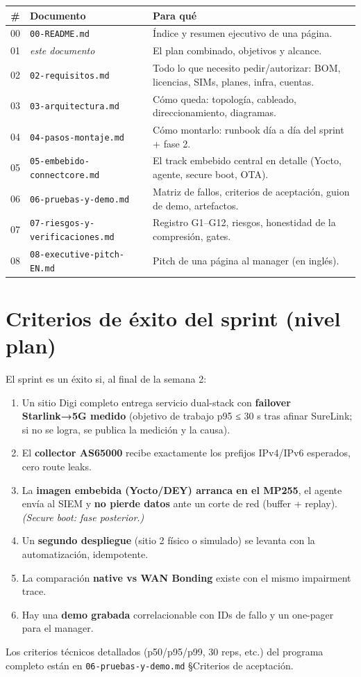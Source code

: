 \documentclass[11pt,a4paper]{article}
\newcommand{\hcell}[1]{\textbf{#1}}
\begin{document}
\begin{center}
\footnotesize
\begin{tabularx}{\textwidth}{@{}c p{5.9cm} X@{}}
\toprule
\hcell{\#} & \hcell{Documento} & \hcell{Para qué} \\
\midrule
00 & \texttt{00-README.md} & Índice y resumen ejecutivo de una página. \\
01 & \emph{este documento} & El plan combinado, objetivos y alcance. \\
02 & \texttt{02-requisitos.md} & Todo lo que necesito pedir/autorizar: BOM, licencias, SIMs, planes, infra, cuentas. \\
03 & \texttt{03-arquitectura.md} & Cómo queda: topología, cableado, direccionamiento, diagramas. \\
04 & \texttt{04-pasos-montaje.md} & Cómo montarlo: runbook día a día del sprint + fase 2. \\
05 & \texttt{05-embebido-connectcore.md} & El track embebido central en detalle (Yocto, agente, secure boot, OTA). \\
06 & \texttt{06-pruebas-y-demo.md} & Matriz de fallos, criterios de aceptación, guion de demo, artefactos. \\
07 & \texttt{07-riesgos-y-verificaciones.md} & Registro G1–G12, riesgos, honestidad de la compresión, gates. \\
08 & \texttt{08-executive-pitch-EN.md} & Pitch de una página al manager (en inglés). \\
\bottomrule
\end{tabularx}
\end{center}

\section{Criterios de éxito del sprint (nivel plan)}

El sprint es un éxito si, al final de la semana 2:
\begin{enumerate}
  \item Un sitio Digi completo entrega servicio dual-stack con \textbf{failover Starlink→5G medido} (objetivo de trabajo p95 ≤ 30 s tras afinar SureLink; si no se logra, se publica la medición y la causa).
  \item El \textbf{collector AS65000} recibe exactamente los prefijos IPv4/IPv6 esperados, cero route leaks.
  \item La \textbf{imagen embebida (Yocto/DEY) arranca en el MP255}, el agente envía al SIEM y \textbf{no pierde datos} ante un corte de red (buffer + replay). \emph{(Secure boot: fase posterior.)}
  \item Un \textbf{segundo despliegue} (sitio 2 físico o simulado) se levanta con la automatización, idempotente.
  \item La comparación \textbf{native vs WAN Bonding} existe con el mismo impairment trace.
  \item Hay una \textbf{demo grabada} correlacionable con IDs de fallo y un one-pager para el manager.
\end{enumerate}

Los criterios técnicos detallados (p50/p95/p99, 30 reps, etc.) del programa completo están en \texttt{06-pruebas-y-demo.md} §Criterios de aceptación.
\end{document}
